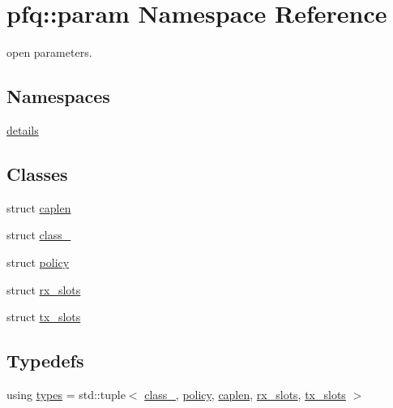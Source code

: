 \hypertarget{namespacepfq_1_1param}{\section{pfq\+:\+:param Namespace Reference}
\label{namespacepfq_1_1param}
}


open parameters.  


\subsection*{Namespaces}
\begin{DoxyCompactItemize}
\item 
 \hyperlink{namespacepfq_1_1param_1_1details}{details}
\end{DoxyCompactItemize}
\subsection*{Classes}
\begin{DoxyCompactItemize}
\item 
struct \hyperlink{structpfq_1_1param_1_1caplen}{caplen}
\item 
struct \hyperlink{structpfq_1_1param_1_1class__}{class\+\_\+}
\item 
struct \hyperlink{structpfq_1_1param_1_1policy}{policy}
\item 
struct \hyperlink{structpfq_1_1param_1_1rx__slots}{rx\+\_\+slots}
\item 
struct \hyperlink{structpfq_1_1param_1_1tx__slots}{tx\+\_\+slots}
\end{DoxyCompactItemize}
\subsection*{Typedefs}
\begin{DoxyCompactItemize}
\item 
using \hyperlink{namespacepfq_1_1param_af3ddce79237872fa77ef9a45bdb48acd}{types} = std\+::tuple$<$ \hyperlink{structpfq_1_1param_1_1class__}{class\+\_\+}, \hyperlink{structpfq_1_1param_1_1policy}{policy}, \hyperlink{structpfq_1_1param_1_1caplen}{caplen}, \hyperlink{structpfq_1_1param_1_1rx__slots}{rx\+\_\+slots}, \hyperlink{structpfq_1_1param_1_1tx__slots}{tx\+\_\+slots} $>$
\end{DoxyCompactItemize}
